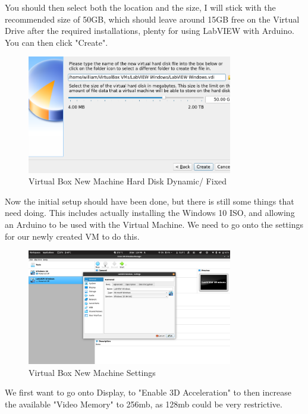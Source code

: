 \documentclass[a4paper,11pt]{report}
\begin{document}
You should then select both the location and the size, I will stick with the recommended size of 50GB, which should leave around 15GB free on the Virtual Drive after the required installations, plenty for using LabVIEW with Arduino. You can then click "Create".

\begin{figure}[H]
\centering
\includegraphics[width=0.8\textwidth]{screenshots/virtualboxharddisksize}
\caption{Virtual Box New Machine Hard Disk Dynamic/ Fixed}
\end{figure}

Now the initial setup should have been done, but there is still some things that need doing. This includes actually installing the Windows 10 ISO, and allowing an Arduino to be used with the Virtual Machine. We need to go onto the settings for our newly created VM to do this.

\begin{figure}[H]
\centering
\includegraphics[width=0.8\textwidth]{screenshots/virtualboxvmsettings}
\caption{Virtual Box New Machine Settings}
\end{figure}

We first want to go onto Display, to "Enable 3D Acceleration" to then increase the available "Video Memory" to 256mb, as 128mb could be very restrictive.
\end{document}
